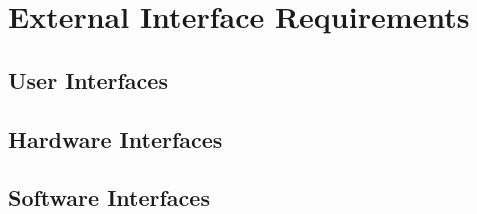 
\chapter{External Interface Requirements} \label{chp:external-interface-requirements}

\section{User Interfaces}
	\begin{comment}
		$<$Describe the logical characteristics of each interface between the software 
		product and the users. This may include sample screen images, any GUI standards 
		or product family style guides that are to be followed, screen layout 
		constraints, standard buttons and functions (e.g., help) that will appear on 
		every screen, keyboard shortcuts, error message display standards, and so on.  
		Define the software components for which a user interface is needed. Details of 
		the user interface design should be documented in a separate user interface 
		specification.$>$
	\end{comment}

\section{Hardware Interfaces}
	\begin{comment}
		$<$Describe the logical and physical characteristics of each interface between 
		the software product and the hardware components of the system. This may include 
		the supported device types, the nature of the data and control interactions 
		between the software and the hardware, and communication protocols to be 
		used.$>$
	\end{comment}
	
\section{Software Interfaces}
	\begin{comment}
		$<$Describe the connections between this product and other specific software 
		components (name and version), including databases, operating systems, tools, 
		libraries, and integrated commercial components. Identify the data items or 
		messages coming into the system and going out and describe the purpose of each.  
		Describe the services needed and the nature of communications. Refer to 
		documents that describe detailed application programming interface protocols.  
		Identify data that will be shared across software components. If the data 
		sharing mechanism must be implemented in a specific way (for example, use of a 
		global data area in a multitasking operating system), specify this as an 
		implementation constraint.$>$
	\end{comment}

